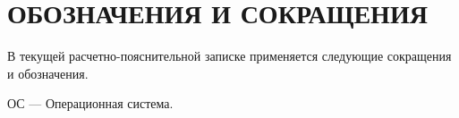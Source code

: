 \section*{\centering ОБОЗНАЧЕНИЯ И СОКРАЩЕНИЯ}

В текущей расчетно-пояснительной записке применяется следующие сокращения и обозначения.

\begin{description}[leftmargin=0pt]
	\item \noindent ОС --- Операционная система.
\end{description}


